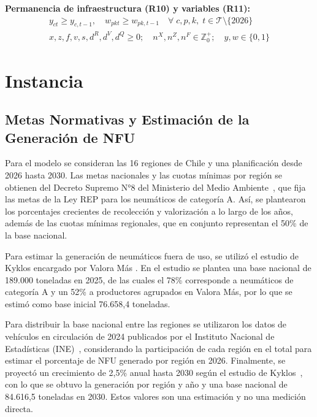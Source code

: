 \documentclass[letterpaper]{article}
\begin{document}
\textbf{Permanencia de infraestructura (R10) y variables (R11):}
\begin{align}
    y_{ct} \geq y_{c,t-1}, \quad w_{pkt} \geq w_{pk,t-1} \quad \forall\; c, p, k,\; t \in \mathcal{T} \setminus \{2026\} \tag{R10} \\
    x, z, f, v, s, d^{R}, d^{V}, d^{Q} \geq 0;\quad n^{X}, n^{Z}, n^{F} \in \mathbb{Z}_{0}^{+};\quad y, w \in \{0,1\} \tag{R11}
\end{align}

\section{Instancia}

\subsection{Metas Normativas y Estimación de la Generación de NFU}



Para el modelo se consideran las 16 regiones de Chile y una planificación desde 2026 hasta 2030. Las metas nacionales y las cuotas mínimas por región se obtienen del Decreto Supremo N°8 del Ministerio del Medio Ambiente~\cite{DS8}, que fija las metas de la Ley REP para los neumáticos de categoría A. Así, se plantearon los porcentajes crecientes de recolección y valorización a lo largo de los años, además de las cuotas mínimas regionales, que en conjunto representan el 50\% de la base nacional.

Para estimar la generación de neumáticos fuera de uso, se utilizó el estudio de Kyklos encargado por Valora Más \cite{kyklos2026}. En el estudio se plantea una base nacional de 189.000 toneladas en 2025, de las cuales el 78\% corresponde a neumáticos de categoría A y un 52\% a productores agrupados en Valora Más, por lo que se estimó como base inicial 76.658,4 toneladas.
 
Para distribuir la base nacional entre las regiones se utilizaron los datos de vehículos en circulación de 2024 publicados por el Instituto Nacional de Estadísticas (INE)~\cite{INE2025}, considerando la participación de cada región en el total para estimar el porcentaje de NFU generado por región en 2026. Finalmente, se proyectó un crecimiento de 2,5\% anual hasta 2030 según el estudio de Kyklos~\cite{kyklos2026}, con lo que se obtuvo la generación por región y año y una base nacional de 84.616,5 toneladas en 2030. Estos valores son una estimación y no una medición directa.
\end{document}
